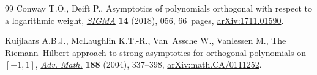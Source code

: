 \documentclass[10pt,a4paper]{amsart}
\numberwithin{equation}{section}
\begin{document}
\begin{thebibliography}{99}
Conway T.O., Deift P., Asymptotics of polynomials orthogonal with respect to a
 logarithmic weight, \href{https://doi.org/10.3842/SIGMA.2018.056}{\textit{SIGMA}} \textbf{14} (2018), 056, 66~pages,
 \href{https://arxiv.org/abs/1711.01590}{arXiv:1711.01590}.


Kuijlaars A.B.J., McLaughlin K.T.-R., Van~Assche W., Vanlessen M., The
 {R}iemann--{H}ilbert approach to strong asymptotics for orthogonal
 polynomials on {$[-1,1]$}, \href{https://doi.org/10.1016/j.aim.2003.08.015}{\textit{Adv. Math.}} \textbf{188} (2004), 337--398,
 \href{https://arxiv.org/abs/math.CA/0111252}{arXiv:math.CA/0111252}.
\end{thebibliography}
\end{document}
